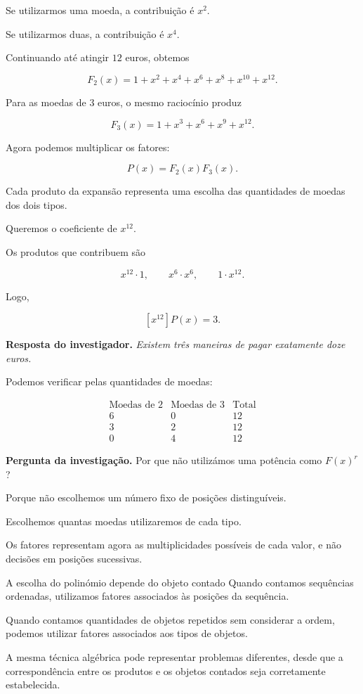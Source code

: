 \documentclass[11pt,a4paper,oneside]{book}
\newcommand{\Pergunta}[1]{\begin{perguntabox}\textbf{Pergunta da investigação.} #1\end{perguntabox}}
\newcommand{\Resposta}[1]{\textcolor{verdeescuro}{\textbf{Resposta do investigador.}} \emph{#1}\par}
\begin{document}
Se utilizarmos uma moeda,
a contribuição é $x^2$.

Se utilizarmos duas,
a contribuição é $x^4$.

Continuando até atingir $12$ euros,
obtemos

\[
F_2(x)=
1+x^2+x^4+x^6+x^8+x^{10}+x^{12}.
\]

Para as moedas de $3$ euros,
o mesmo raciocínio produz

\[
F_3(x)=1+x^3+x^6+x^9+x^{12}.
\]

Agora podemos multiplicar os fatores:

\[
P(x)=F_2(x)F_3(x).
\]

Cada produto da expansão representa
uma escolha das quantidades de moedas
dos dois tipos.

Queremos o coeficiente de $x^{12}$.

Os produtos que contribuem são

\[
x^{12}\cdot1,
\qquad
x^6\cdot x^6,
\qquad
1\cdot x^{12}.
\]

Logo,

\[
[x^{12}]P(x)=\boxed{3}.
\]

\Resposta{Existem três maneiras
de pagar exatamente doze euros.}

Podemos verificar pelas quantidades
de moedas:

\[
\begin{array}{c|c|c}
\text{Moedas de }2&
\text{Moedas de }3&
\text{Total}\\
\hline
6&0&12\\
3&2&12\\
0&4&12
\end{array}
\]

\Pergunta{Por que não utilizámos
uma potência como $F(x)^r$?}

Porque não escolhemos um número
fixo de posições distinguíveis.

Escolhemos quantas moedas utilizaremos
de cada tipo.

Os fatores representam agora
as multiplicidades possíveis de
cada valor, e não decisões
em posições sucessivas.

\begin{observacaobox}{A escolha do polinómio depende do objeto contado}
Quando contamos sequências ordenadas,
utilizamos fatores associados
às posições da sequência.

Quando contamos quantidades de
objetos repetidos sem considerar
a ordem, podemos utilizar fatores
associados aos tipos de objetos.

A mesma técnica algébrica
pode representar problemas diferentes,
desde que a correspondência entre
os produtos e os objetos contados
seja corretamente estabelecida.
\end{observacaobox}
\end{document}
